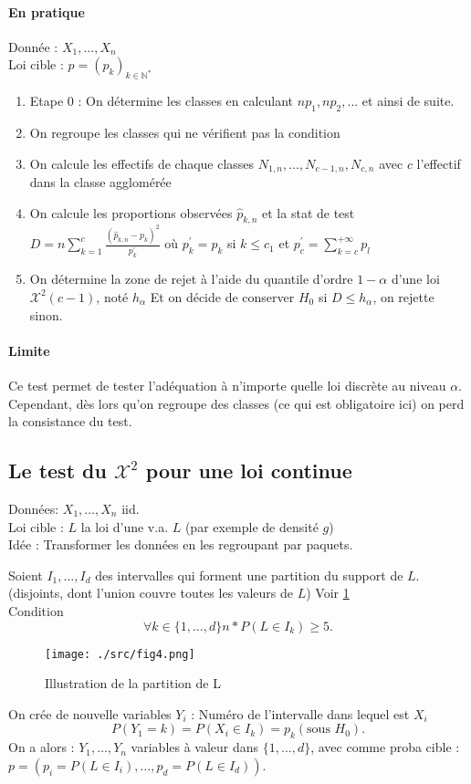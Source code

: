 \documentclass{article}
\theoremstyle{plain}%
\theoremstyle{definition}
\theoremstyle{remark}
\begin{document}
\paragraph{En pratique}
    Donnée : $ X_1, \dots, X_n$ \\
    Loi cible : $p = (p_k)_{k \in \mathbb{N}^*}$
    \begin{enumerate}
        \item Etape 0 : On détermine les classes en calculant $ np_1, np_2, ... $ et ainsi de suite.
        \item On regroupe les classes qui ne vérifient pas la condition
        \item On calcule les effectifs de chaque classes $ N_{1,n}, \dots, N_{c-1, n}, N_{c,n} $ avec $ c $ l'effectif dans la classe agglomérée
        \item On calcule les proportions observées $ \hat{p}_{k,n} $ et la stat de test $ D = n \sum_{k=1}^{c} \frac{(\hat{p}_{k,n} - p_k)^2}{p_k^\prime } $ où $ p_k^\prime = p_k $ si $ k \leq c_1 $ et $ p^\prime _c = \sum_{k=c}^{+\infty } p_l $ 
        \item On détermine la zone de rejet à l'aide du quantile d'ordre $ 1 - \alpha $ d'une loi $ \mathcal{X}^2(c-1) $, noté $ h_\alpha  $ Et on décide de conserver $ H_0 $ si $ D \leq h_\alpha  $, on rejette sinon.
    \end{enumerate}

\paragraph{Limite}
Ce test permet de tester l'adéquation à n'importe quelle loi discrète au niveau $ \alpha  $. Cependant, dès lors qu'on regroupe des classes (ce qui est obligatoire ici) on perd la consistance du test. 


\subsection{Le test du $ \mathcal{X}^2$ pour une loi continue}
Données: $ X_1, \dots, X_n $ iid. \\
Loi cible : $ L $ la loi d'une v.a. $ L $ (par exemple de densité $ g $) \\
Idée : Transformer les données en les regroupant par paquets. 

Soient $ I_1, \dots, I_d $ des intervalles qui forment une partition du support de $ L $. (disjoints, dont l'union couvre toutes les valeurs de $ L $) Voir \ref{fig4} \\
Condition 
\[
    \forall k \in \{1, \dots,d \} n * P(L \in I_k) \geq 5
.\]
\begin{figure}[!htbp]
    \centering
    \texttt{[image: ./src/fig4.png]}
    \caption{Illustration de la partition de L}
    \label{fig4}
\end{figure}
On crée de nouvelle variables $ Y_i $ : Numéro de l'intervalle dans lequel est $ X_i $ 
\[
    P(Y_1=k) = P(X_i \in I_k) = p_k (\text{sous }H_0)
.\]
On a alors : $ Y_1, \dots, Y_n $ variables à valeur dans $ \{1,...,d\} $, avec comme proba cible : $ p=(p_i = P(L \in I_i), \dots, p_d = P(L \in I_d)) $. 
\end{document}

